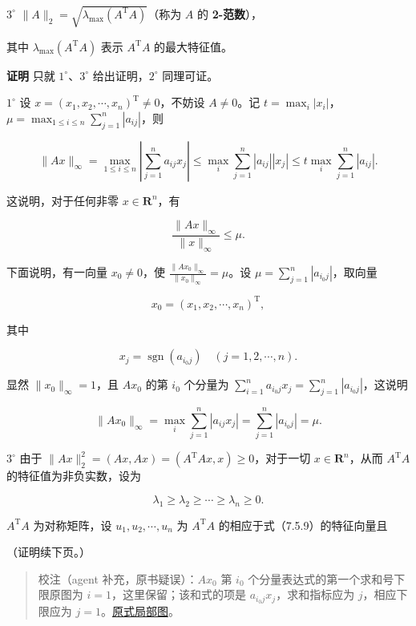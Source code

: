 \documentclass[
  10pt,
  fontset=fandol]{ctexart}
\begin{document}
\(3^\circ\) \(\|A\|_2=\sqrt{\lambda_{\max}(A^{\mathrm T}A)}\)（称为
\(A\) 的 \textbf{2-范数}），

其中 \(\lambda_{\max}(A^{\mathrm T}A)\) 表示 \(A^{\mathrm T}A\)
的最大特征值。

\textbf{证明} 只就 \(1^\circ\)、\(3^\circ\) 给出证明，\(2^\circ\)
同理可证。

\(1^\circ\) 设 \(x=(x_1,x_2,\cdots,x_n)^{\mathrm T}\neq0\)，不妨设
\(A\neq0\)。记
\(t=\max_i|x_i|\)，\(\mu=\max_{1\leqslant i\leqslant n}\sum_{j=1}^{n}|a_{ij}|\)，则

\[
\|Ax\|_\infty
=\max_{1\leqslant i\leqslant n}\left|\sum_{j=1}^{n}a_{ij}x_j\right|
\leqslant\max_i\sum_{j=1}^{n}|a_{ij}||x_j|
\leqslant t\max_i\sum_{j=1}^{n}|a_{ij}|.
\]

这说明，对于任何非零 \(x\in\mathbf R^n\)，有

\[
\frac{\|Ax\|_\infty}{\|x\|_\infty}\leqslant\mu.
\tag{7.5.8}
\]

下面说明，有一向量 \(x_0\neq0\)，使
\(\frac{\|Ax_0\|_\infty}{\|x_0\|_\infty}=\mu\)。设
\(\mu=\sum_{j=1}^{n}|a_{i_0j}|\)，取向量

\[
x_0=(x_1,x_2,\cdots,x_n)^{\mathrm T},
\]

其中

\[
x_j=\operatorname{sgn}(a_{i_0j})\quad(j=1,2,\cdots,n).
\]

显然 \(\|x_0\|_\infty=1\)，且 \(Ax_0\) 的第 \(i_0\) 个分量为
\(\sum_{i=1}^{n}a_{i_0j}x_j=\sum_{j=1}^{n}|a_{i_0j}|\)，这说明

\[
\|Ax_0\|_\infty=\max_i\sum_{j=1}^{n}|a_{ij}x_j|=\sum_{j=1}^{n}|a_{i_0j}|=\mu.
\]

\(3^\circ\) 由于
\(\|Ax\|_2^2=(Ax,Ax)=(A^{\mathrm T}Ax,x)\geqslant0\)，对于一切
\(x\in\mathbf R^n\)，从而 \(A^{\mathrm T}A\) 的特征值为非负实数，设为

\[
\lambda_1\geqslant\lambda_2\geqslant\cdots\geqslant\lambda_n\geqslant0.
\tag{7.5.9}
\]

\(A^{\mathrm T}A\) 为对称矩阵，设 \(u_1,u_2,\cdots,u_n\) 为
\(A^{\mathrm T}A\) 的相应于式（7.5.9）的特征向量且

（证明续下页。）

\begin{quote}
校注（agent 补充，原书疑误）：\(Ax_0\) 第 \(i_0\)
个分量表达式的第一个求和号下限原图为 \(i=1\)，这里保留；该和式的项是
\(a_{i_0j}x_j\)，求和指标应为 \(j\)，相应下限应为
\(j=1\)。\href{/Users/xiangjunfeng/Desktop/数值计算专用/numerical-analysis/book/staging/ch07b/assets/203-sum-index.png}{原式局部图}。
\end{quote}
\end{document}
